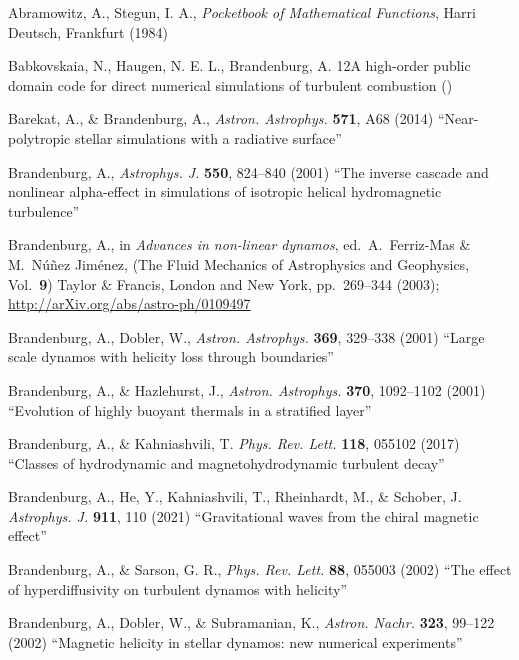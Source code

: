 \documentclass[\mydriver,12pt,twoside,notitlepage,a4paper]{article}
\begin{document}
\begin{thebibliography}{99}

 Abramowitz, A., Stegun, I. A.,
  \emph{Pocketbook of Mathematical Functions\/},
  Harri Deutsch, Frankfurt (1984)

 Babkovskaia, N., Haugen, N. E. L., Brandenburg, A.
{12}{A high-order public domain code for direct numerical simulations of turbulent combustion}
()

 Barekat, A., \& Brandenburg, A.,
  \emph{Astron. Astrophys.} \textbf{571}, A68 (2014)
  ``Near-polytropic stellar simulations with a radiative surface''

 Brandenburg, A.,
  \emph{Astrophys. J.} \textbf{550}, 824--840 (2001)
  ``The inverse cascade and nonlinear alpha-effect in simulations
  of isotropic helical hydromagnetic turbulence''

 Brandenburg, A., in \emph{Advances in non-linear dynamos},
  ed.\ A.\ Ferriz-Mas \& M.\ N\'u\~nez Jim\'enez,
  (The Fluid Mechanics of Astrophysics and Geophysics, Vol.\ {\bf9})
  Taylor \& Francis, London and New York, pp.~269--344 (2003);
  \url{http://arXiv.org/abs/astro-ph/0109497}

 Brandenburg, A., Dobler, W.,
  \emph{Astron. Astrophys.} \textbf{369}, 329--338 (2001)
  ``Large scale dynamos with helicity loss through boundaries''

 Brandenburg, A., \& Hazlehurst, J.,
  \emph{Astron. Astrophys.} \textbf{370}, 1092--1102 (2001)
  ``Evolution of highly buoyant thermals in a stratified layer''

 Brandenburg, A., \& Kahniashvili, T.
  \emph{Phys. Rev. Lett.} \textbf{118}, 055102 (2017)
  ``Classes of hydrodynamic and magnetohydrodynamic turbulent decay''

 Brandenburg, A., He, Y., Kahniashvili, T., Rheinhardt, M., \& Schober, J.
  \emph{Astrophys. J.} \textbf{911}, 110 (2021)
  ``Gravitational waves from the chiral magnetic effect''

 Brandenburg, A., \& Sarson, G. R.,
  \emph{Phys. Rev. Lett.} \textbf{88}, 055003 (2002)
  ``The effect of hyperdiffusivity on turbulent dynamos with helicity''

Brandenburg, A., Dobler, W., \& Subramanian, K.,
  \emph{Astron. Nachr.} \textbf{323}, 99--122 (2002)
  ``Magnetic helicity in stellar dynamos: new numerical experiments''


\end{thebibliography}
\end{document}
